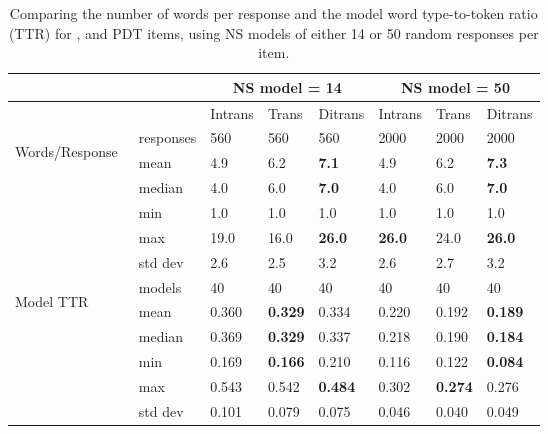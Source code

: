 \begin{table}[htb!]
\begin{center}
\setlength{\tabcolsep}{.6em}
\begin{tabular}{|l|l||l|l|l||l|l|l|}
\hline
 && \multicolumn{3}{c||}{NS model = 14} & \multicolumn{3}{c|}{NS model = 50} \\
\hline
	&	& Intrans 	& Trans 	& Ditrans 		& Intrans 	& Trans 	& Ditrans 		\\
\hline
\multirow{3}{*}{\begin{sideways}Words/Response~ \end{sideways}} & responses	& 560  & 560 & 560 & 2000 & 2000 & 2000	 \\
\cline{2-8}
& mean 		& 4.9 	& 6.2		& \textbf{7.1} 	& 4.9		& 6.2 	& \textbf{7.3}	 \\
\cline{2-8}
& median 	& 4.0 	& 6.0		& \textbf{7.0} 	& 4.0		& 6.0 	& \textbf{7.0}	 \\
\cline{2-8}
& min 		& 1.0 	& 1.0		& 1.0 			& 1.0		& 1.0 	& 1.0	 \\
\cline{2-8}
& max 		& 19.0 	& 16.0	& \textbf{26.0} & \textbf{26.0}	& 24.0 	& \textbf{26.0}	 \\
\cline{2-8}
& std dev 	& 2.6 	& 2.5		& 3.2 			& 2.6		& 2.7 	& 3.2	 \\
\hline
\hline
\multirow{3}{*}{\begin{sideways}Model TTR~~~~~ \end{sideways}} & models	& 40 & 40 & 40 	& 40 & 40 & 40	 \\
\cline{2-8}
& mean 		& 0.360 	& \textbf{0.329} 		& 0.334 	& 0.220		& 0.192 		& \textbf{0.189}	 \\
\cline{2-8}
& median 	& 0.369 	& \textbf{0.329}		& 0.337 	& 0.218		& 0.190 		& \textbf{0.184}	 \\
\cline{2-8}
& min 		& 0.169 	& \textbf{0.166}		& 0.210 	& 0.116		& 0.122 		& \textbf{0.084}	 \\
\cline{2-8}
& max 		& 0.543 	& 0.542			& \textbf{0.484} 	& 0.302		& \textbf{0.274} & 0.276	 \\
\cline{2-8}
& std dev 	& 0.101 	& 0.079					& 0.075 	& 0.046		& 0.040 		& 0.049	 \\
\hline
\end{tabular}
\caption{\label{tab:transitivity-model-stats}Comparing the number of words per response and the model word type-to-token ratio (TTR) for ,  and  PDT items, using NS models of either 14 or 50 random responses per item.
}
\end{center}
\end{table}

